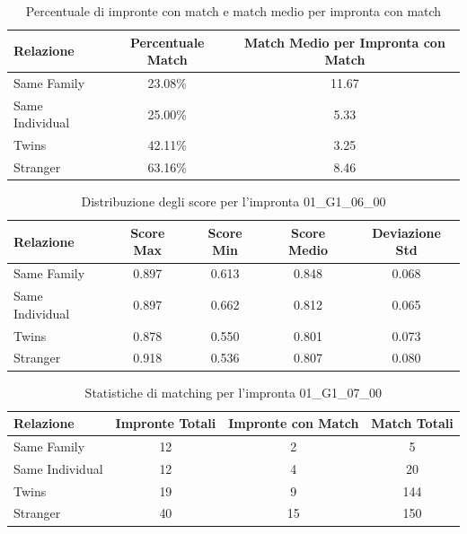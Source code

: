 \begin{table}[htbp]
\centering
\caption{Percentuale di impronte con match e match medio per impronta con match}
\label{tab:match_percentage_01_G1_06_00}
\begin{tabular}{|l|c|c|}
\hline
\textbf{Relazione} & \textbf{Percentuale Match} & \textbf{Match Medio per Impronta con Match} \\
\hline
Same Family & 23.08\% & 11.67 \\
\hline
Same Individual & 25.00\% & 5.33 \\
\hline
Twins & 42.11\% & 3.25 \\
\hline
Stranger & 63.16\% & 8.46 \\
\hline
\end{tabular}
\end{table}


\begin{table}[htbp]
\centering
\caption{Distribuzione degli score per l'impronta 01\_G1\_06\_00}
\label{tab:scores_01_G1_06_00}
\begin{tabular}{|l|c|c|c|c|}
\hline
\textbf{Relazione} & \textbf{Score Max} & \textbf{Score Min} & \textbf{Score Medio} & \textbf{Deviazione Std} \\
\hline
Same Family & 0.897 & 0.613 & 0.848 & 0.068 \\
\hline
Same Individual & 0.897 & 0.662 & 0.812 & 0.065 \\
\hline
Twins & 0.878 & 0.550 & 0.801 & 0.073 \\
\hline
Stranger & 0.918 & 0.536 & 0.807 & 0.080 \\
\hline
\end{tabular}
\end{table}


\begin{table}[htbp]
\centering
\caption{Statistiche di matching per l'impronta 01\_G1\_07\_00}
\label{tab:results_01_G1_07_00}
\begin{tabular}{|l|c|c|c|}
\hline
\textbf{Relazione} & \textbf{Impronte Totali} & \textbf{Impronte con Match} & \textbf{Match Totali} \\
\hline
Same Family & 12 & 2 & 5 \\
\hline
Same Individual & 12 & 4 & 20 \\
\hline
Twins & 19 & 9 & 144 \\
\hline
Stranger & 40 & 15 & 150 \\
\hline
\end{tabular}
\end{table}


